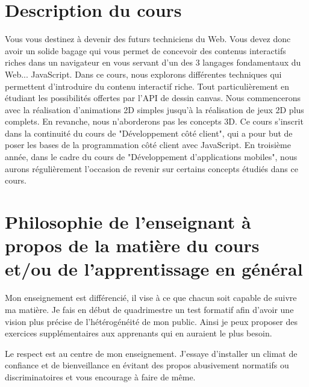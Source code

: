 \section{Description du cours}

Vous vous destinez à devenir des futurs techniciens du Web. Vous devez donc avoir un solide bagage qui vous permet de concevoir des contenus interactifs riches dans un navigateur en vous servant d’un des 3 langages fondamentaux du Web... JavaScript. Dans ce cours, nous explorons différentes techniques qui permettent d’introduire du contenu interactif riche. Tout particulièrement en étudiant les possibilités offertes par l’API de dessin canvas. Nous commencerons avec la réalisation d’animations 2D simples jusqu’à la réalisation de jeux 2D plus complets. En revanche, nous n’aborderons pas les concepts 3D.
Ce cours s’inscrit dans la continuité du cours de "Développement côté client", qui a pour but de poser les bases de la programmation côté client avec JavaScript. En troisième année, dans le cadre du cours de "Développement d'applications mobiles", nous aurons régulièrement l’occasion de revenir sur certains concepts étudiés dans ce cours.
\clearpage
\section{Philosophie de l’enseignant à propos de la matière du cours et/ou de l’apprentissage en général}

Mon enseignement est différencié, il vise à ce que chacun soit capable de suivre ma matière. Je fais en début de quadrimestre un test formatif afin d’avoir une vision plus précise de l’hétérogénéité de mon public. Ainsi je peux proposer des exercices supplémentaires aux apprenants qui en auraient le plus besoin.

Le respect est au centre de mon enseignement. J’essaye d’installer un climat de confiance et de bienveillance en évitant des propos abusivement normatifs ou discriminatoires et vous encourage à faire de même.

